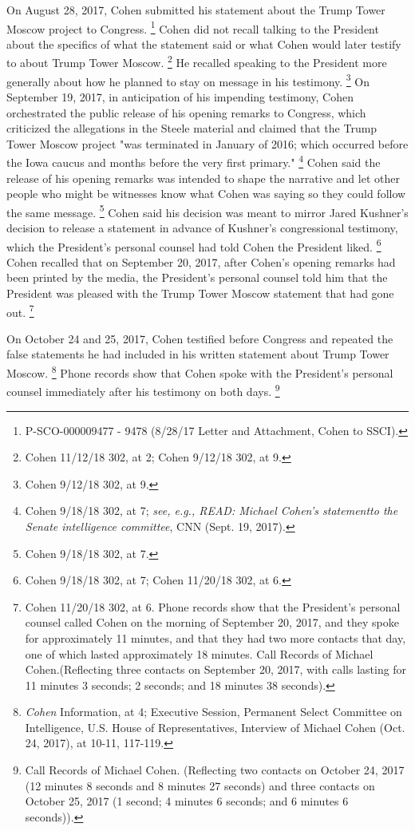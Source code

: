 On August 28, 2017, Cohen submitted his statement about the Trump Tower Moscow project to Congress.%
\footnote{P-SCO-000009477 - 9478 (8/28/17 Letter and Attachment, Cohen to SSCI).}
Cohen did not recall talking to the President about the specifics of what the statement said or what Cohen would later testify to about Trump Tower Moscow.%
\footnote{Cohen 11/12/18 302, at 2;
Cohen 9/12/18 302, at 9.}
He recalled speaking to the President more generally about how he planned to stay on message in his testimony.%
\footnote{Cohen 9/12/18 302, at 9.}
On September 19, 2017, in anticipation of his impending testimony, Cohen orchestrated the public release of his opening remarks to Congress, which criticized the allegations in the Steele material and claimed that the Trump Tower Moscow project "was terminated in January of 2016; which occurred before the Iowa caucus and months before the very first primary."%
\footnote{Cohen 9/18/18 302, at 7;
\textit{see, e.g., READ: Michael Cohen’s statementto the Senate intelligence committee}, CNN (Sept. 19, 2017).}
Cohen said the release of his opening remarks was intended to shape the narrative and let other people who might be witnesses know what Cohen was saying so they could follow the same message.%
\footnote{Cohen 9/18/18 302, at 7.}
Cohen said his decision was meant to mirror Jared Kushner's decision to release a statement in advance of Kushner's congressional testimony, which the President's personal counsel had told Cohen the President liked.%
\footnote{Cohen 9/18/18 302, at 7;
Cohen 11/20/18 302, at 6.}
Cohen recalled that on September 20, 2017, after Cohen's opening remarks had been printed by the media, the President's personal counsel told him that the President was pleased with the Trump Tower Moscow statement that had gone out.%
\footnote{Cohen 11/20/18 302, at 6.
Phone records show that the President’s personal counsel called Cohen on the morning of September 20, 2017, and they spoke for approximately 11 minutes, and that they had two more contacts that day, one of which lasted approximately 18 minutes.
Call Records of Michael Cohen.(Reflecting three contacts on September 20, 2017, with calls lasting for 11 minutes 3 seconds; 2 seconds; and 18 minutes 38 seconds).}

On October 24 and 25, 2017, Cohen testified before Congress and repeated the false statements he had included in his written statement about Trump Tower Moscow.%
\footnote{\textit{Cohen} Information, at 4;
Executive Session, Permanent Select Committee on Intelligence, U.S. House of Representatives, Interview of Michael Cohen (Oct. 24, 2017), at 10-11, 117-119.}
Phone records show that Cohen spoke with the President's personal counsel immediately after his testimony on both days.%
\footnote{Call Records of Michael Cohen.
(Reflecting two contacts on October 24, 2017 (12 minutes 8 seconds and 8 minutes 27 seconds) and three contacts on October 25, 2017 (1 second; 4 minutes 6 seconds; and 6 minutes 6 seconds)).}

